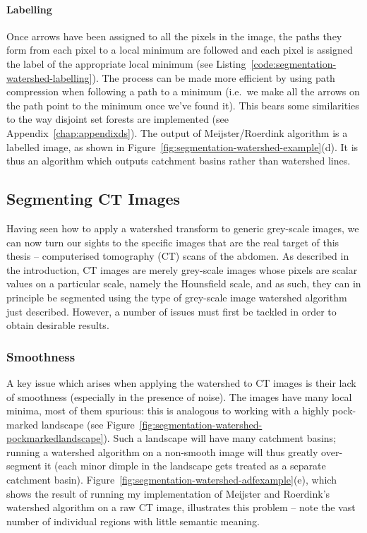 \paragraph{Labelling}

Once arrows have been assigned to all the pixels in the image, the paths they form from each pixel to a local minimum are followed and each pixel is assigned the label of the appropriate local minimum (see Listing~\ref{code:segmentation-watershed-labelling}). The process can be made more efficient by using path compression when following a path to a minimum (i.e.~we make all the arrows on the path point to the minimum once we've found it). This bears some similarities to the way disjoint set forests are implemented (see Appendix~\ref{chap:appendixds}). The output of Meijster/Roerdink algorithm is a labelled image, as shown in Figure~\ref{fig:segmentation-watershed-example}(d). It is thus an algorithm which outputs catchment basins rather than watershed lines.

\subsection{Segmenting CT Images}
\label{subsec:segmentation-watershed-ct}

Having seen how to apply a watershed transform to generic grey-scale images, we can now turn our sights to the specific images that are the real target of this thesis -- computerised tomography (CT) scans of the abdomen. As described in the introduction, CT images are merely grey-scale images whose pixels are scalar values on a particular scale, namely the Hounsfield scale, and as such, they can in principle be segmented using the type of grey-scale image watershed algorithm just described. However, a number of issues must first be tackled in order to obtain desirable results.

\subsubsection{Smoothness}

A key issue which arises when applying the watershed to CT images is their lack of smoothness (especially in the presence of noise). The images have many local minima, most of them spurious: this is analogous to working with a highly pock-marked landscape (see Figure~\ref{fig:segmentation-watershed-pockmarkedlandscape}). Such a landscape will have many catchment basins; running a watershed algorithm on a non-smooth image will thus greatly over-segment it (each minor dimple in the landscape gets treated as a separate catchment basin). Figure~\ref{fig:segmentation-watershed-adfexample}(e), which shows the result of running my implementation of Meijster and Roerdink's watershed algorithm on a raw CT image, illustrates this problem -- note the vast number of individual regions with little semantic meaning.

